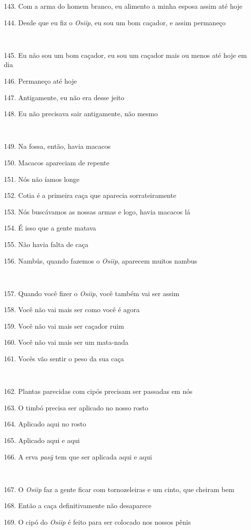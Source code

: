 143. Com a arma do homem branco, eu alimento a minha esposa assim até hoje

144. Desde que eu fiz o \emph{Osiip}, eu sou um bom caçador, e assim permaneço

~

145. Eu não sou um bom caçador, eu sou um caçador mais ou menos até hoje em dia

146. Permaneço até hoje

147. Antigamente, eu não era desse jeito

148. Eu não precisava sair antigamente, não mesmo

~

149. Na fossa, então, havia macacos

150. Macacos apareciam de repente

151. Nós não íamos longe

152. Cotia é a primeira caça que aparecia sorrateiramente

153. Nós buscávamos as nossas armas e logo, havia macacos lá

154. É isso que a gente matava

155. Não havia falta de caça

156. Nambús, quando fazemos o \emph{Osiip}, aparecem muitos nambus

~

157. Quando você fizer o \emph{Osiip}, você também vai ser assim

158. Você não vai mais ser como você é agora

159. Você não vai mais ser caçador ruim

160. Você não vai mais ser um mata-nada

161. Vocês vão sentir o peso da sua caça

~

162. Plantas parecidas com cipós precisam ser passadas em nós

163. O timbó precisa ser aplicado no nosso rosto

164. Aplicado aqui no rosto

165. Aplicado aqui e aqui

166. A erva \emph{pasỹ} tem que ser aplicada aqui e aqui

~

167. O \emph{Osiip} faz a gente ficar com tornozeleiras e um cinto, que
cheiram bem

168. Então a caça definitivamente não desaparece

169. O cipó do \emph{Osiip} é feito para ser colocado nos nossos pênis

